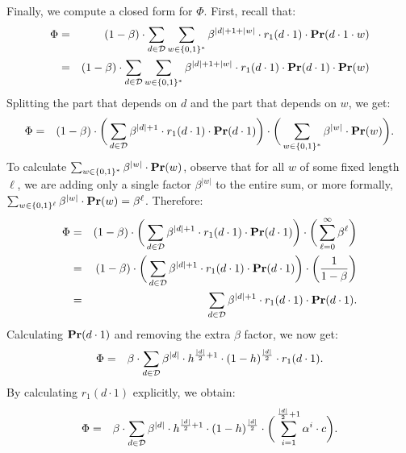 Finally, we compute a closed form for $\Phi$. First, recall that:
\begin{eqnarray*}
\Phi & = & (1-\beta) \cdot \sum_{d\in \mathcal{D}}  \sum_{w\in \{0,1\}^*}\beta^{|d|+1+|w|}\cdot r_1(d \cdot 1) \cdot \mathbf{Pr}(d \cdot 1 \cdot w)\\
& = & (1-\beta) \cdot \sum_{d\in \mathcal{D}}  \sum_{w\in \{0,1\}^*}\beta^{|d|+1+|w|}\cdot r_1(d \cdot 1) \cdot \mathbf{Pr}(d \cdot 1) \cdot \mathbf{Pr}(w)
\end{eqnarray*}
Splitting the part that depends on $d$ and the part that depends on $w$, we get:
\begin{eqnarray*}
\Phi & = & (1-\beta) \cdot \bigg(\sum_{d\in \mathcal{D}}  \beta^{|d|+1}\cdot r_1(d \cdot 1) \cdot \mathbf{Pr}(d \cdot 1)\bigg) \cdot  \bigg(\sum_{w\in \{0,1\}^*} \beta^{|w|}\cdot \mathbf{Pr}(w)\bigg).
\end{eqnarray*}
To calculate $\sum_{w\in \{0,1\}^*} \beta^{|w|}\cdot \mathbf{Pr}(w)$, observe that for all $w$ of some fixed length $\ell$, we are adding only a single factor $\beta^{|w|}$ to the entire sum, or more formally,  %
$\sum_{w\in \{0,1\}^{\ell}} \beta^{|w|}\cdot \mathbf{Pr}(w) = \beta^{\ell}$. Therefore:
\begin{eqnarray*}
\Phi & = & (1-\beta) \cdot \bigg(\sum_{d\in \mathcal{D}}  \beta^{|d|+1}\cdot r_1(d \cdot 1) \cdot \mathbf{Pr}(d \cdot 1)\bigg) \cdot \bigg(\sum_{\ell = 0}^\infty \beta^\ell\bigg)\\
& = & (1-\beta) \cdot \bigg(\sum_{d\in \mathcal{D}}  \beta^{|d|+1}\cdot r_1(d \cdot 1) \cdot \mathbf{Pr}(d \cdot 1)\bigg) \cdot \bigg(\frac{1}{1-\beta}\bigg)\\
& = & \sum_{d\in \mathcal{D}}  \beta^{|d|+1}\cdot r_1(d \cdot 1) \cdot \mathbf{Pr}(d \cdot 1).
\end{eqnarray*}
Calculating $\mathbf{Pr}(d \cdot 1)$ and removing the extra $\beta$ factor, we now get:
\begin{eqnarray*}
\Phi & = & \beta \cdot \sum_{d\in \mathcal{D}}  \beta^{|d|} \cdot h^{\frac{|d|}{2}+1}\cdot (1-h)^{\frac{|d|}{2}}\cdot r_1(d \cdot 1).
\end{eqnarray*}
By calculating $r_1(d \cdot 1)$ explicitly, we obtain:
\begin{eqnarray*}
\Phi & = & \beta \cdot \sum_{d\in \mathcal{D}}  \beta^{|d|} \cdot h^{\frac{|d|}{2}+1}\cdot (1-h)^{\frac{|d|}{2}}\cdot \bigg(\sum_{i=1}^{\frac{|d|}{2}+1}\alpha^i \cdot c\bigg).
\end{eqnarray*}
